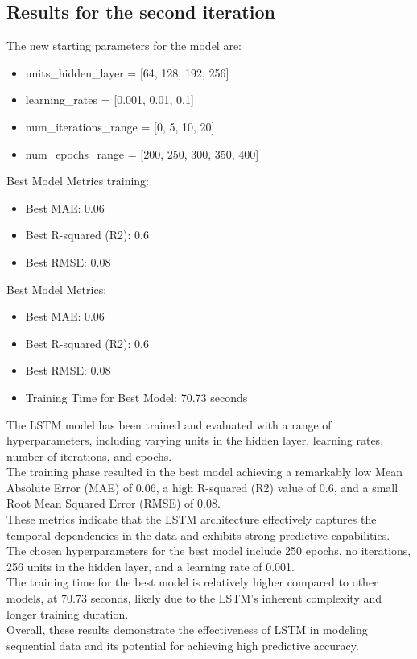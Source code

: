 \documentclass[10pt]{article} %
\begin{document}
    \subsection{Results for the second iteration}

    The new starting parameters for the model are:
    \begin{itemize}
        \item  units\_hidden\_layer = [64, 128, 192, 256]
        \item learning\_rates = [0.001, 0.01, 0.1]
        \item num\_iterations\_range = [0, 5, 10, 20]
        \item num\_epochs\_range = [200, 250, 300, 350, 400]
    \end{itemize}
    
    Best Model Metrics training:
        \begin{itemize}
            \item Best MAE: 0.06
            \item Best R-squared (R2): 0.6
            \item Best RMSE: 0.08
        \end{itemize}
    
    Best Model Metrics:
    
        \begin{itemize}
            \item Best MAE: 0.06
            \item Best R-squared (R2): 0.6
            \item Best RMSE: 0.08
            \item Training Time for Best Model:  70.73 seconds
        \end{itemize}
    The LSTM model has been trained and evaluated with a range of hyperparameters, including varying units in the hidden layer, learning rates, number of iterations, and epochs.
    \\The training phase resulted in the best model achieving a remarkably low Mean Absolute Error (MAE) of 0.06, a high R-squared (R2) value of 0.6, and a small Root Mean Squared Error (RMSE) of 0.08.
    \\These metrics indicate that the LSTM architecture effectively captures the temporal dependencies in the data and exhibits strong predictive capabilities.
    \\The chosen hyperparameters for the best model include 250 epochs, no iterations, 256 units in the hidden layer, and a learning rate of 0.001.
    \\The training time for the best model is relatively higher compared to other models, at 70.73 seconds, likely due to the LSTM's inherent complexity and longer training duration.
    \\Overall, these results demonstrate the effectiveness of LSTM in modeling sequential data and its potential for achieving high predictive accuracy.
    
\end{document}
